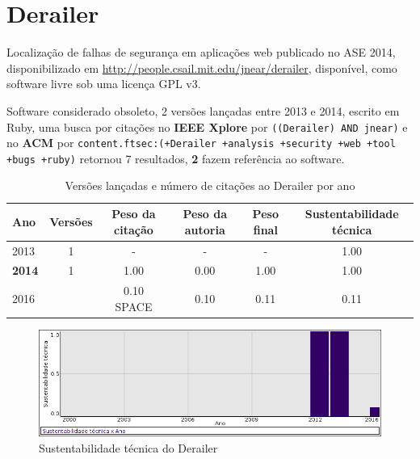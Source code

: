 \section{Derailer}

Localização de falhas de segurança em aplicações web
publicado no ASE 2014,
disponibilizado em \url{http://people.csail.mit.edu/jnear/derailer},
disponível,
como software livre
sob uma licença GPL v3.

Software considerado obsoleto,
2 versões lançadas
entre 2013 e 2014,
escrito em Ruby,
uma busca por citações no {\bf IEEE Xplore} por
\texttt{((Derailer) AND jnear)}
e no {\bf ACM} por
\texttt{content.ftsec:(+Derailer +analysis +security +web +tool +bugs +ruby)}
retornou
7 resultados,
{\bf 2} fazem referência ao software.


\begin{table}[H]
\caption{Versões lançadas e número de citações ao Derailer por ano}
\centering
\begin{tabular}{| l | c | c | c | c | c |}
  \hline
  Ano & Versões & Peso da citação & Peso da autoria & Peso final & Sustentabilidade técnica \\
  \hline
        2013 & 1 & - & - & -
        &
          {\color{blue} 1.00}
        \\
\hline
            {\bf 2014}
          &
          1
          &
          1.00
          &
          0.00
          &
          1.00
          &
            {\color{blue} 1.00}
          \\
\hline
            2016
          &
          
          &
          0.10
            {\tiny SPACE}
          &
          0.10
          &
          0.11
          &
            {\color{red} 0.11}
          \\
\hline
\end{tabular}
\end{table}

\begin{figure}[h]
  \center
  \includegraphics[scale=0.50]{imagens/softwares-charts/derailer.png}
  \caption{Sustentabilidade técnica do Derailer}
\end{figure}


